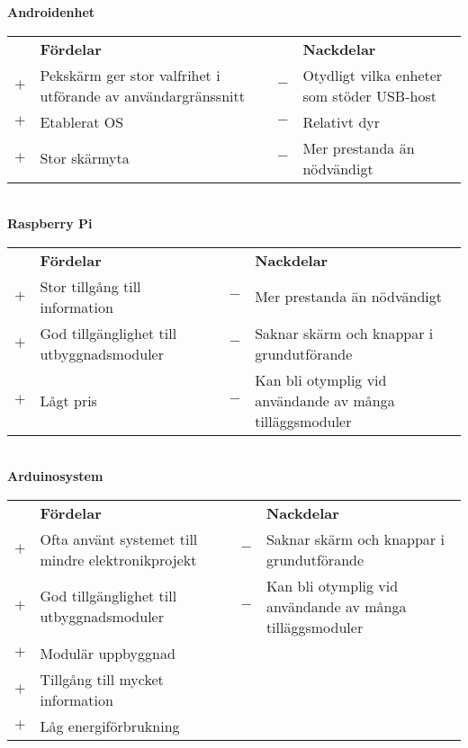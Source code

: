 \documentclass{article}
\begin{document}
        \noindent\textsf{\textbf{Androidenhet}}\\
        \begin{tabularx}{\textwidth}{@{}cXcX}
            & \textbf{Fördelar}     & & \textbf{Nackdelar} \\
            $+$ & Pekskärm ger stor valfrihet i utförande av användargränssnitt     &                            $-$ & Otydligt vilka enheter som
                                              stöder USB-host \\
            $+$ &  Etablerat OS     &   $-$ & Relativt dyr \\
            $+$ &  Stor skärmyta    &   $-$ & Mer prestanda än nödvändigt
        \end{tabularx}\\

            
        \noindent\textsf{\textbf{Raspberry Pi}}\\
        \begin{tabularx}{\textwidth}{@{}cXcX}
            & \textbf{Fördelar}     & & \textbf{Nackdelar} \\
            $+$ & Stor tillgång till information & 
                                    $-$ & Mer prestanda än nödvändigt \\
            $+$ & God tillgänglighet till utbyggnads\-moduler & 
                                    $-$ & Saknar skärm och knappar i 
                                          grundutförande \\
            $+$ & Lågt pris &       $-$ & Kan bli otymplig vid användande av   
                                        många tilläggsmoduler \\   
        \end{tabularx}\\

        \noindent\textsf{\textbf{Arduinosystem}}\\
        \begin{tabularx}{\textwidth}{@{}cXcX}
            & \textbf{Fördelar}     & & \textbf{Nackdelar} \\
            $+$ & Ofta använt systemet till mindre elektronikprojekt & 
                                    $-$ & Saknar skärm och knappar i 
                                        grundutförande \\
            $+$ & God tillgänglighet till utbyggnads\-moduler & 
                                    $-$ & Kan bli otymplig vid användande av   
                                        många tilläggsmoduler \\
            $+$ & Modulär uppbyggnad \\
            $+$ & Tillgång till mycket information \\
            $+$ & Låg energiförbrukning \\
        \end{tabularx} \\
\end{document}
